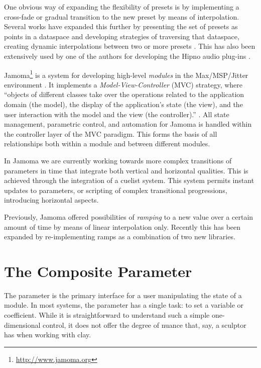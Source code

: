 \documentclass{article}
\begin{document}
One obvious way of expanding the flexibility of presets is by implementing a cross-fade or gradual transition to the new preset by means of interpolation. Several works have expanded this further by presenting the set of presets as points in a dataspace and developing strategies of traversing that dataspace, creating dynamic interpolations between two or more presets \cite{Bencina:2005metasurface, Dahlstedt:2001, Momeni:2003}. This has also been extensively used by one of the authors for developing the Hipno audio plug-ins \cite{Place:2005hipno}.

Jamoma\footnote{\url{http://www.jamoma.org}} is a system for developing high-level \emph{modules} in the Max/MSP/Jitter environment \cite{Place:2006}. It implements a \emph{Model-View-Controller} (MVC) strategy, where ``objects of different classes take over the operations related to the application domain (the model), the display of the application's state (the view), and the user interaction with the model and the view (the controller).'' \cite[p.~26]{Krasner:1988}. All state management, parametric control, and automation for Jamoma is handled within the controller layer of the MVC paradigm. This forms the basis of all relationships both within a module and between different modules.

In Jamoma we are currently working towards more complex transitions of parameters in time that integrate both vertical and horizontal qualities.  This is achieved through the integration of a cuelist system. This system permits instant updates to parameters, or scripting of complex transitional progressions, introducing horizontal aspects. 

Previously, Jamoma offered possibilities of \emph{ramping} to a new value over a certain amount of time by means of linear interpolation only. Recently this has been expanded by re-implementing ramps as a combination of two new libraries.


\section{The Composite Parameter} %
\label{sec:the_composite_parameter}

The parameter is the primary interface for a user manipulating the state of a module. In most systems, the parameter has a single task: to set a variable or coefficient. While it is straightforward to understand such a simple one-dimensional control, it does not offer the degree of nuance that, say, a sculptor has when working with clay.
\end{document}
